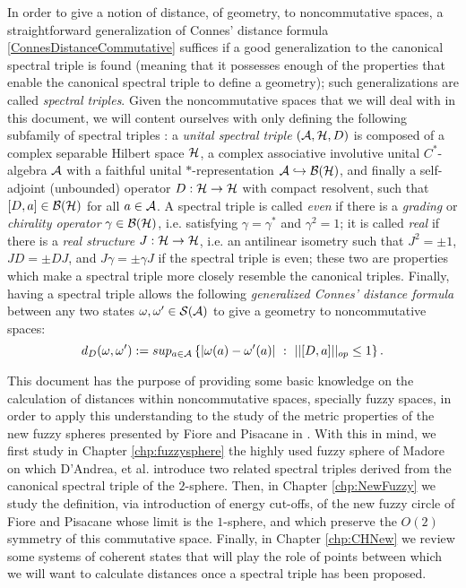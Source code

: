 In order to give a notion of distance, of geometry, to noncommutative spaces, a straightforward generalization of Connes' distance formula \eqref{ConnesDistanceCommutative} suffices if a good generalization to the canonical spectral triple is found (meaning that it possesses enough of the properties that enable the canonical spectral triple to define a geometry); such generalizations are called \emph{spectral triples}. Given the noncommutative spaces that we will deal with in this document, we will content ourselves with only defining the following subfamily of spectral triples \cite{DAndrea2013}: a \emph{unital spectral triple} $(\mathcal A, \mathcal H, D)$ is composed of a complex separable Hilbert space $\mathcal H$, a complex associative involutive unital $C^*$-algebra $\mathcal A$ with a faithful unital $*$-representation $\mathcal A \hookrightarrow \mathcal B(\mathcal H)$, and finally a self-adjoint (unbounded) operator $D:\mathcal H \to \mathcal H$ with compact resolvent, such that $[D, a]\in \mathcal B(\mathcal H)$ for all $a \in \mathcal A$. A spectral triple is called \emph{even} if there is a \emph{grading} or \emph{chirality operator} $\gamma \in \mathcal B(\mathcal H)$, i.e. satisfying $\gamma = \gamma^*$ and $\gamma^2 = 1$; it is called \emph{real} if there is a \emph{real structure} $J: \mathcal H \to \mathcal H$, i.e. an antilinear isometry such that $J^2 = \pm 1$, $JD = \pm DJ $, and $J\gamma = \pm \gamma J$ if the spectral triple is even; these two are properties which make a spectral triple more closely resemble the canonical triples. Finally, having a spectral triple allows the following \emph{generalized Connes' distance formula} between any two states $\omega, \omega' \in \mathcal S(\mathcal A)$ to give a geometry to noncommutative spaces:
\begin{equation}\label{ConnesDistanceFormula}
    d_D(\omega, \omega') := sup_{a \in \mathcal A} \left\{|\omega(a) - \omega'(a)| \, \,:\, \, ||[D, a]||_{op} \leq 1 \right\}.
\end{equation}
 
This document has the purpose of providing some basic knowledge on the calculation of distances within noncommutative spaces, specially fuzzy spaces, in order to apply this understanding to the study of the metric properties of the new fuzzy spheres presented by Fiore and Pisacane in \cite{Fiore2018}. With this in mind, we first study in Chapter \ref{chp:fuzzysphere} the highly used fuzzy sphere of Madore \cite{Madore} on which D'Andrea, et al. \cite{DAndrea2013} introduce two related spectral triples derived from the canonical spectral triple of the $2$-sphere. Then, in Chapter \ref{chp:NewFuzzy} we study the definition, via introduction of energy cut-offs, of the new fuzzy circle of Fiore and Pisacane whose limit is the $1$-sphere, and which preserve the $O(2)$ symmetry of this commutative space. Finally, in Chapter \ref{chp:CHNew} we review some systems of coherent states that will play the role of points between which we will want to calculate distances once a spectral triple has been proposed.

